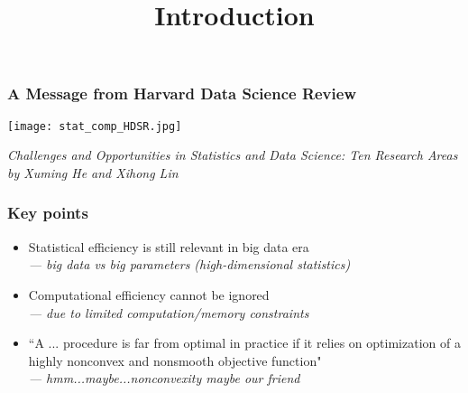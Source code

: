\documentclass[compress,
mathserif,wide,%
]{beamer}
\title %
{ Introduction}
\begin{document}
\begin{frame}[plain]
  \titlepage

\end{frame}

\begin{frame}
	\frametitle{A Message from Harvard Data Science Review}

	\begin{center}
\texttt{[image: stat\_comp\_HDSR.jpg]}

\end{center}	
	{\scriptsize  \em \hfill  Challenges and Opportunities in Statistics and Data Science: Ten Research Areas \\
	\hfill by Xuming He and Xihong Lin}
\end{frame}

\begin{frame}
	\frametitle{Key points}
	\begin{itemize}
		\item Statistical efficiency is still relevant in big data era \\\pause
			{\hfill \em --- big data vs big parameters (high-dimensional statistics)} \\ \pause
		\item Computational efficiency cannot be ignored  \\ \pause
			{\hfill \em --- due to limited computation/memory constraints} \pause
		\item ``A ... procedure is far from optimal in practice if it relies on optimization  of a highly nonconvex and nonsmooth objective function" \\ \pause
			{\hfill \em --- hmm...maybe...nonconvexity maybe our friend}
	\end{itemize}
\end{frame}
\end{document}
